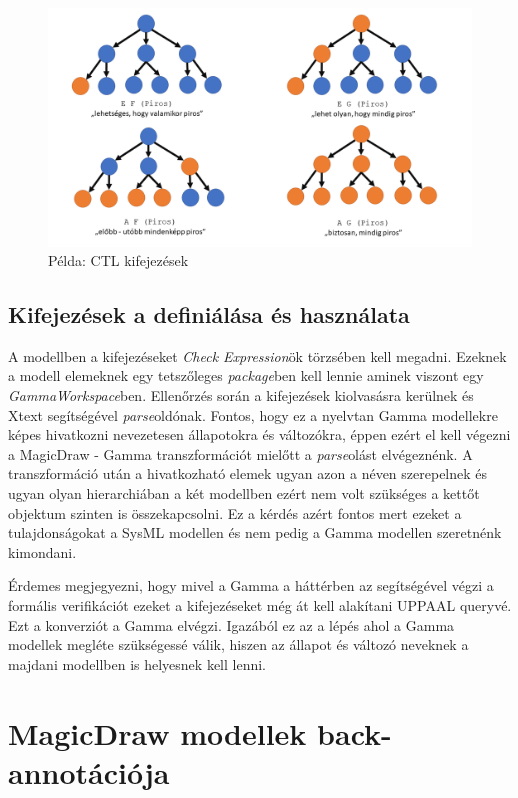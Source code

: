 \begin{figure}[!ht]
	\centering
	\includegraphics[width=140mm, keepaspectratio]{figures/contribution/CTL.png}
	\caption{Példa: CTL kifejezések}
	\label{fig:ctl}
\end{figure}

\subsection{Kifejezések a definiálása és használata}
A modellben a kifejezéseket \emph{Check Expression}ök törzsében kell megadni. Ezeknek a modell elemeknek egy tetszőleges \emph{package}ben kell lennie aminek viszont egy \emph{GammaWorkspace}ben. Ellenőrzés során a kifejezések kiolvasásra kerülnek és Xtext segítségével \emph{parse}oldónak. Fontos, hogy ez a nyelvtan Gamma modellekre képes hivatkozni nevezetesen állapotokra és változókra, éppen ezért el kell végezni a MagicDraw - Gamma transzformációt mielőtt a \emph{parse}olást elvégeznénk. A transzformáció után a hivatkozható elemek ugyan azon a néven szerepelnek és ugyan olyan hierarchiában a két modellben ezért nem volt szükséges a kettőt objektum szinten is összekapcsolni. Ez  a kérdés azért fontos mert ezeket a tulajdonságokat a SysML modellen és nem pedig a Gamma modellen szeretnénk kimondani.

Érdemes megjegyezni, hogy mivel a Gamma a háttérben az \uppaal segítségével végzi a formális verifikációt ezeket a kifejezéseket még át kell alakítani UPPAAL queryvé. Ezt a konverziót a Gamma elvégzi. Igazából ez az a lépés ahol a Gamma modellek megléte szükségessé válik, hiszen az állapot és változó neveknek a majdani \uppaal modellben is helyesnek kell lenni.


\section{MagicDraw modellek back-annotációja}

